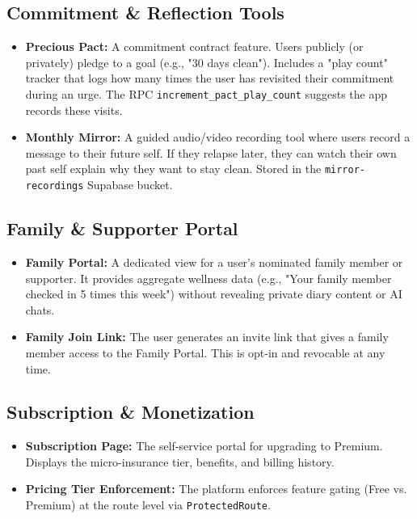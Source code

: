 \documentclass[11pt,a4paper]{article}
\begin{document}
\subsection{Commitment \& Reflection Tools}
\begin{itemize}
    \item \textbf{Precious Pact:} A commitment contract feature. Users publicly (or privately) pledge to a goal (e.g., "30 days clean"). Includes a "play count" tracker that logs how many times the user has revisited their commitment during an urge. The RPC \texttt{increment\_pact\_play\_count} suggests the app records these visits.
    \item \textbf{Monthly Mirror:} A guided audio/video recording tool where users record a message to their future self. If they relapse later, they can watch their own past self explain why they want to stay clean. Stored in the \texttt{mirror-recordings} Supabase bucket.
\end{itemize}

\subsection{Family \& Supporter Portal}
\begin{itemize}
    \item \textbf{Family Portal:} A dedicated view for a user's nominated family member or supporter. It provides aggregate wellness data (e.g., "Your family member checked in 5 times this week") without revealing private diary content or AI chats.
    \item \textbf{Family Join Link:} The user generates an invite link that gives a family member access to the Family Portal. This is opt-in and revocable at any time.
\end{itemize}

\subsection{Subscription \& Monetization}
\begin{itemize}
    \item \textbf{Subscription Page:} The self-service portal for upgrading to Premium. Displays the micro-insurance tier, benefits, and billing history.
    \item \textbf{Pricing Tier Enforcement:} The platform enforces feature gating (Free vs. Premium) at the route level via \texttt{ProtectedRoute}.
\end{itemize}
\end{document}
